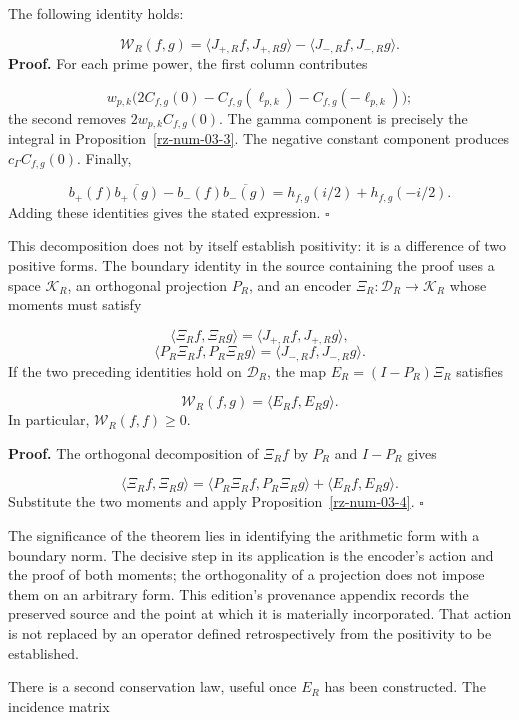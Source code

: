 The following identity holds:

\[
\mathscr W_R(f,g)
=\langle J_{+,R}f,J_{+,R}g\rangle
-\langle J_{-,R}f,J_{-,R}g\rangle.
\]
\textbf{Proof.} For each prime power, the first column contributes

\[
w_{p,k}\bigl(2C_{f,g}(0)
-C_{f,g}(\ell_{p,k})-C_{f,g}(-\ell_{p,k})\bigr);
\]
the second removes \(2w_{p,k}C_{f,g}(0)\). The gamma component is precisely the integral in Proposition~\ref{rz-num-03-3}. The negative constant component produces \(c_\Gamma C_{f,g}(0)\). Finally,

\[
b_+(f)\overline{b_+(g)}-b_-(f)\overline{b_-(g)}
=h_{f,g}(i/2)+h_{f,g}(-i/2).
\]
Adding these identities gives the stated expression. \hfill\(\square\)

This decomposition does not by itself establish positivity: it is a difference of two positive forms. The boundary identity in the source containing the proof uses a space \(\mathcal K_R\), an orthogonal projection \(P_R\), and an encoder \(\Xi_R:\mathcal D_R\to\mathcal K_R\) whose moments must satisfy

\[
\langle\Xi_Rf,\Xi_Rg\rangle
=\langle J_{+,R}f,J_{+,R}g\rangle,
\]
\[
\langle P_R\Xi_Rf,P_R\Xi_Rg\rangle
=\langle J_{-,R}f,J_{-,R}g\rangle.
\]
If the two preceding identities hold on \(\mathcal D_R\), the map \(E_R=(I-P_R)\Xi_R\) satisfies

\[
\mathscr W_R(f,g)=\langle E_Rf,E_Rg\rangle.
\]
In particular, \(\mathscr W_R(f,f)\geq0\).

\textbf{Proof.} The orthogonal decomposition of \(\Xi_Rf\) by \(P_R\) and \(I-P_R\) gives

\[
\langle\Xi_Rf,\Xi_Rg\rangle
=\langle P_R\Xi_Rf,P_R\Xi_Rg\rangle
+\langle E_Rf,E_Rg\rangle.
\]
Substitute the two moments and apply Proposition~\ref{rz-num-03-4}. \hfill\(\square\)

The significance of the theorem lies in identifying the arithmetic form with a boundary norm. The decisive step in its application is the encoder's action and the proof of both moments; the orthogonality of a projection does not impose them on an arbitrary form. This edition's provenance appendix records the preserved source and the point at which it is materially incorporated. That action is not replaced by an operator defined retrospectively from the positivity to be established.

There is a second conservation law, useful once \(E_R\) has been constructed. The incidence matrix

